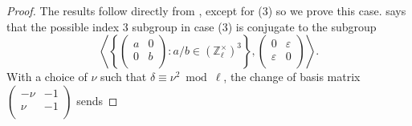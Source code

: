 \documentclass[11pt]{amsart}
\theoremstyle{definition}
\newcommand{\Z}{\mathbb Z}
\begin{document}
\begin{proof} The results follow directly from \cite[Theorems 1.4, 1.8]{lozano-galoiscm}, except for (3) so we prove this case. \cite[Thm. 1.4]{lozano-galoiscm} says that the possible index 3 subgroup in case (3) is
conjugate to the subgroup \[ \left\langle \left\{\left(\begin{array}{cc} a & 0\\ 0 & b\\ \end{array}\right) : a/b \in (\Z_\ell^\times)^3\right\}, \left(\begin{array}{cc} 0 & \varepsilon\\ \varepsilon & 0\\ \end{array}\right)\right\rangle. \]
With a choice of $\nu$ such that $\delta \equiv \nu^2 \bmod \ell$, the change of basis matrix $\displaystyle \left(\begin{array}{cc} -\nu & -1 \\ \nu & -1 \\ \end{array}\right)$
sends 

\end{proof}
\end{document}
